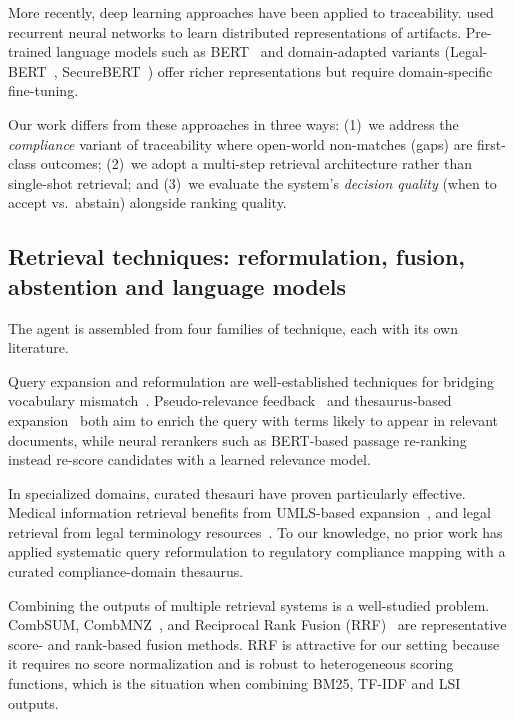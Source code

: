\documentclass[smallextended,natbib]{svjour3}
\begin{document}
More recently, deep learning approaches have been applied to traceability.
\citet{Guo2017} used recurrent neural networks to learn distributed representations of artifacts.
Pre-trained language models such as BERT~\citep{Devlin2019} and domain-adapted variants (Legal-BERT~\citep{Chalkidis2020}, SecureBERT~\citep{Aghaei2022}) offer richer representations but require domain-specific fine-tuning.

Our work differs from these approaches in three ways: (1)~we address the \emph{compliance} variant of traceability where open-world non-matches (gaps) are first-class outcomes; (2)~we adopt a multi-step retrieval architecture rather than single-shot retrieval; and (3)~we evaluate the system's \emph{decision quality} (when to accept vs.\ abstain) alongside ranking quality.

\subsection{Retrieval techniques: reformulation, fusion, abstention and language models}
\label{sec:related-methods}

The agent is assembled from four families of technique, each with its own literature.

Query expansion and reformulation are well-established techniques for bridging vocabulary mismatch~\citep{Carpineto2012}.
Pseudo-relevance feedback~\citep{Rocchio1971} and thesaurus-based expansion~\citep{Voorhees1994} both aim to enrich the query with terms likely to appear in relevant documents, while neural rerankers such as BERT-based passage re-ranking~\citep{Nogueira2019} instead re-score candidates with a learned relevance model.

In specialized domains, curated thesauri have proven particularly effective.
Medical information retrieval benefits from UMLS-based expansion~\citep{Aronson2010}, and legal retrieval from legal terminology resources~\citep{Maxwell2017}.
To our knowledge, no prior work has applied systematic query reformulation to regulatory compliance mapping with a curated compliance-domain thesaurus.

Combining the outputs of multiple retrieval systems is a well-studied problem.
CombSUM, CombMNZ~\citep{Fox1994}, and Reciprocal Rank Fusion (RRF)~\citep{Cormack2009} are representative score- and rank-based fusion methods.
RRF is attractive for our setting because it requires no score normalization and is robust to heterogeneous scoring functions, which is the situation when combining BM25, TF-IDF and LSI outputs.
\end{document}

